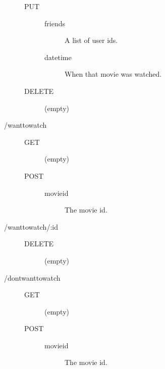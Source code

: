 \begin{description}
\begin{description}
\begin{description}
        \end{description}
      \item [PUT] \hfill
        \begin{description}
          \item [friends] A list of user ids.
          \item [datetime] When that movie was watched.
        \end{description}
      \item [DELETE] \hfill
        \begin{description}
          \item [(empty)]
        \end{description}
    \end{description}
  \item [/wanttowatch] \hfill
    \begin{description}
      \item [GET] \hfill
        \begin{description}
          \item [(empty)]
        \end{description}
      \item [POST] \hfill
        \begin{description}
          \item [movieid] The movie id.
        \end{description}
    \end{description}
  \item [/wanttowatch/:id] \hfill
    \begin{description}
      \item [DELETE] \hfill
        \begin{description}
          \item [(empty)]
        \end{description}
    \end{description}
  \item [/dontwanttowatch] \hfill
    \begin{description}
      \item [GET] \hfill
        \begin{description}
          \item [(empty)]
        \end{description}
      \item [POST] \hfill
        \begin{description}
          \item [movieid] The movie id.

\end{description}
\end{description}
\end{description}
